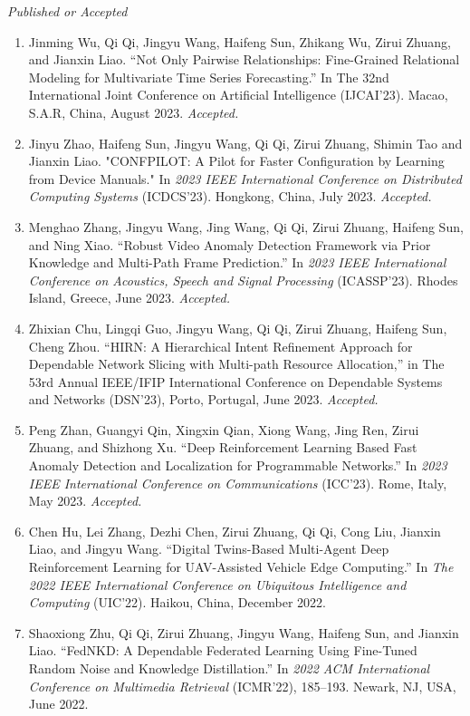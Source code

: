 \documentclass[letterpaper,11pt]{article}
\newcommand{\contentlength}{5.5in}
\begin{document}
\begin{tcolorbox}[flush right,breakable,colback=white,colframe=white,width=\contentlength]
		\textit{Published or Accepted}
		\begin{enumerate}[itemsep=0mm]
			\item Jinming Wu, Qi Qi, Jingyu Wang, Haifeng Sun, Zhikang Wu, Zirui Zhuang, and Jianxin Liao. “Not Only Pairwise Relationships: Fine-Grained Relational Modeling for Multivariate Time Series Forecasting.” In The 32nd International Joint Conference on Artificial Intelligence (IJCAI'23). Macao, S.A.R, China, August 2023. \textit{Accepted.}
			\item Jinyu Zhao, Haifeng Sun, Jingyu Wang, Qi Qi, Zirui Zhuang, Shimin Tao and Jianxin Liao. "CONFPILOT: A Pilot for Faster Configuration by Learning from Device Manuals." In \textit{2023 IEEE International Conference on Distributed Computing Systems} (ICDCS'23). Hongkong, China, July 2023. \textit{Accepted.}
			\item Menghao Zhang, Jingyu Wang, Jing Wang, Qi Qi, Zirui Zhuang, Haifeng Sun, and Ning Xiao. “Robust Video Anomaly Detection Framework via Prior Knowledge and Multi-Path Frame Prediction.” In \textit{2023 IEEE International Conference on Acoustics, Speech and Signal Processing} (ICASSP’23). Rhodes Island, Greece, June 2023. \textit{Accepted.}
			\item Zhixian Chu, Lingqi Guo, Jingyu Wang, Qi Qi, Zirui Zhuang, Haifeng Sun, Cheng Zhou. “HIRN: A Hierarchical Intent Refinement Approach for Dependable Network Slicing with Multi-path Resource Allocation,” in The 53rd Annual IEEE/IFIP International Conference on Dependable Systems and Networks (DSN’23), Porto, Portugal, June 2023. \textit{Accepted.}
			\item Peng Zhan, Guangyi Qin, Xingxin Qian, Xiong Wang, Jing Ren, Zirui Zhuang, and Shizhong Xu. “Deep Reinforcement Learning Based Fast Anomaly Detection and Localization for Programmable Networks.” In \textit{2023 IEEE International Conference on Communications} (ICC’23). Rome, Italy, May 2023. \textit{Accepted.}
			\item Chen Hu, Lei Zhang, Dezhi Chen, Zirui Zhuang, Qi Qi, Cong Liu, Jianxin Liao, and Jingyu Wang. “Digital Twins-Based Multi-Agent Deep Reinforcement Learning for UAV-Assisted Vehicle Edge Computing.” In \textit{The 2022 IEEE International Conference on Ubiquitous Intelligence and Computing} (UIC’22). Haikou, China, December 2022.
			\item Shaoxiong Zhu, Qi Qi, Zirui Zhuang, Jingyu Wang, Haifeng Sun, and Jianxin Liao. “FedNKD: A Dependable Federated Learning Using Fine-Tuned Random Noise and Knowledge Distillation.” In \textit{2022 ACM International Conference on Multimedia Retrieval} (ICMR'22), 185–193. Newark, NJ, USA, June 2022.

\end{enumerate}
\end{tcolorbox}
\end{document}
